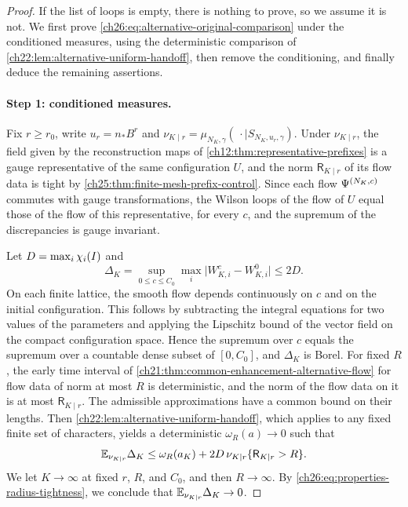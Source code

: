 \begin{proof}
If the list of loops is empty, there is nothing to prove, so we assume it is not. We first prove \eqref{ch26:eq:alternative-original-comparison} under the conditioned measures, using the deterministic comparison of \cref{ch22:lem:alternative-uniform-handoff}, then remove the conditioning, and finally deduce the remaining assertions.

\paragraph{Step 1: conditioned measures.}
Fix $r\ge r_0$, write $u_r=n_*B^r$ and $\nu_{K\mid r}=\mu_{N_K,\gamma}(\,\cdot\mid S_{N_K,u_r,\gamma})$. Under $\nu_{K\mid r}$, the field given by the reconstruction maps of \cref{ch12:thm:representative-prefixes} is a gauge representative of the same configuration $U$, and the norm $\mathsf R_{K\mid r}$ of its flow data is tight by \cref{ch25:thm:finite-mesh-prefix-control}. Since each flow $\Psi^{(N_K,c)}$ commutes with gauge transformations, the Wilson loops of the flow of $U$ equal those of the flow of this representative, for every $c$, and the supremum of the discrepancies is gauge invariant.

Let $D=\max_i\chi_i(I)$ and
\[
 \Delta_K=\sup_{0\le c\le C_0}\max_i\bigl\lvert W^c_{K,i}-W^0_{K,i}\bigr\rvert\le2D.
\]
On each finite lattice, the smooth flow depends continuously on $c$ and on the initial configuration. This follows by subtracting the integral equations for two values of the parameters and applying the Lipschitz bound of the vector field on the compact configuration space. Hence the supremum over $c$ equals the supremum over a countable dense subset of $[0,C_0]$, and $\Delta_K$ is Borel. For fixed $R$, the early time interval of \cref{ch21:thm:common-enhancement-alternative-flow} for flow data of norm at most $R$ is deterministic, and the norm of the flow data on it is at most $\mathsf R_{K\mid r}$. The admissible approximations have a common bound on their lengths. Then \cref{ch22:lem:alternative-uniform-handoff}, which applies to any fixed finite set of characters, yields a deterministic $\omega_R(a)\to0$ such that
\[
 \mathbb E_{\nu_{K\mid r}}\Delta_K\le\omega_R(a_K)+2D\,\nu_{K\mid r}\{\mathsf R_{K\mid r}>R\}.
\]
We let $K\to\infty$ at fixed $r$, $R$, and $C_0$, and then $R\to\infty$. By \eqref{ch26:eq:properties-radius-tightness}, we conclude that $\mathbb E_{\nu_{K\mid r}}\Delta_K\to0$.


\end{proof}
